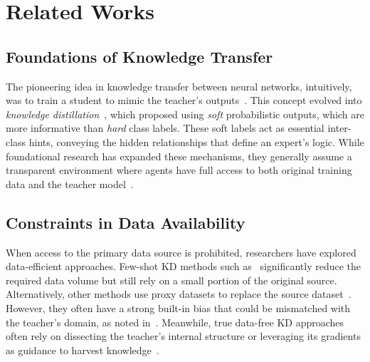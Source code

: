 \section{Related Works} \label{sec:02-related}

\subsection{Foundations of Knowledge Transfer} \label{sec:02-related-kd}
\begin{foldable} %
  The pioneering idea in knowledge transfer between neural networks, intuitively, was to train a student to mimic the teacher's outputs~\cite{bucila2006model}.
  This concept evolved into \textit{knowledge distillation}~\cite{hinton2015distilling}, which proposed using \textit{soft} probabilistic outputs, which are more informative than \textit{hard} class labels.
  These soft labels act as essential inter-class hints, conveying the hidden relationships that define an expert's logic.
  While foundational research has expanded these mechanisms, they generally assume a transparent environment where agents have full access to both original training data and the teacher model~\cite{romero2015fitnets, nguyen2021knowledge}.
\end{foldable}

\subsection{Constraints in Data Availability} \label{sec:02-related-dfkd}
\begin{foldable} %
  When access to the primary data source is prohibited, researchers have explored data-efficient approaches.
  Few-shot KD methods such as~\cite{wang2020neural, nguyen2022black, vo2024improving} significantly reduce the required data volume but still rely on a small portion of the original source.
  Alternatively, other methods use proxy datasets to replace the source dataset~\cite{chen2021learning, tang2023distribution}.
  However, they often have a strong built-in bias that could be mismatched with the teacher's domain, as noted in~\cite{torralba2011unbiased}.
  Meanwhile, true data-free KD approaches often rely on dissecting the teacher's internal structure or leveraging its gradients as guidance to harvest knowledge~\cite{chen2019data, fang2021contrastive, do2022momentum, tran2024nayer}.
\end{foldable}

